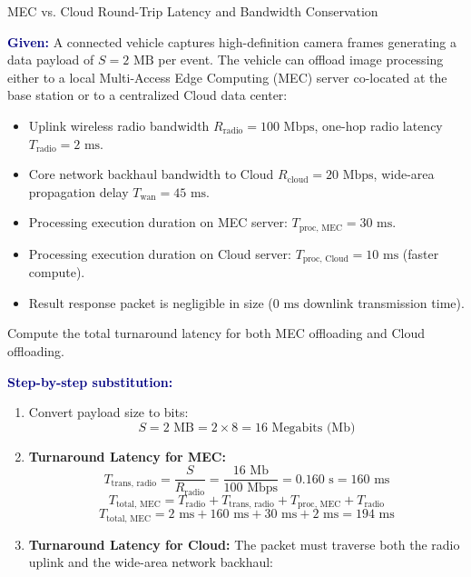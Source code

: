 \documentclass[11pt,a4paper,openany]{report}
\newcommand{\Given}{\par\textbf{\textcolor{navy}{Given:}} }
\newcommand{\Steps}{\par\textbf{\textcolor{navy}{Step-by-step substitution:}}\par}
\begin{document}
\begin{solved}{MEC vs. Cloud Round-Trip Latency and Bandwidth Conservation}
\Given A connected vehicle captures high-definition camera frames generating a data payload of $S = 2\text{ MB}$ per event. The vehicle can offload image processing either to a local Multi-Access Edge Computing (MEC) server co-located at the base station or to a centralized Cloud data center:
\begin{itemize}[leftmargin=*]
  \item Uplink wireless radio bandwidth $R_{\text{radio}} = 100\text{ Mbps}$, one-hop radio latency $T_{\text{radio}} = 2\text{ ms}$.
  \item Core network backhaul bandwidth to Cloud $R_{\text{cloud}} = 20\text{ Mbps}$, wide-area propagation delay $T_{\text{wan}} = 45\text{ ms}$.
  \item Processing execution duration on MEC server: $T_{\text{proc, MEC}} = 30\text{ ms}$.
  \item Processing execution duration on Cloud server: $T_{\text{proc, Cloud}} = 10\text{ ms}$ (faster compute).
  \item Result response packet is negligible in size ($0\text{ ms}$ downlink transmission time).
\end{itemize}
Compute the total turnaround latency for both MEC offloading and Cloud offloading.
\Steps
\begin{enumerate}[leftmargin=*]
  \item Convert payload size to bits:
  \begin{equation}
  S = 2\text{ MB} = 2 \times 8 = 16\text{ Megabits (Mb)}
  \end{equation}
  \item \textbf{Turnaround Latency for MEC:}
  \begin{equation}
  T_{\text{trans, radio}} = \frac{S}{R_{\text{radio}}} = \frac{16\text{ Mb}}{100\text{ Mbps}} = 0.160\text{ s} = 160\text{ ms}
  \end{equation}
  \begin{equation}
  T_{\text{total, MEC}} = T_{\text{radio}} + T_{\text{trans, radio}} + T_{\text{proc, MEC}} + T_{\text{radio}}
  \end{equation}
  \begin{equation}
  T_{\text{total, MEC}} = 2\text{ ms} + 160\text{ ms} + 30\text{ ms} + 2\text{ ms} = 194\text{ ms}
  \end{equation}
  \item \textbf{Turnaround Latency for Cloud:}
  The packet must traverse both the radio uplink and the wide-area network backhaul:

\end{enumerate}
\end{solved}
\end{document}
